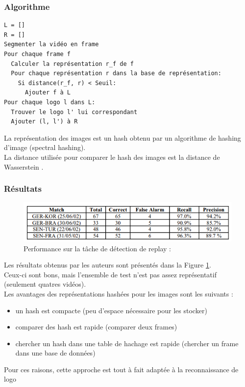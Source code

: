 \documentclass[11pt]{article}
\begin{document}
\subsubsection{Algorithme}
\label{sec:orgb02b649}
\begin{verbatim}
L = []
R = []
Segmenter la vidéo en frame
Pour chaque frame f
  Calculer la représentation r_f de f
  Pour chaque représentation r dans la base de représentation:
    Si distance(r_f, r) < Seuil:
      Ajouter f à L
Pour chaque logo l dans L:
  Trouver le logo l' lui correspondant
  Ajouter (l, l') à R
\end{verbatim}
La représentation des images est un hash obtenu par un algorithme de hashing d'image (spectral hashing).\\
La distance utilisée pour comparer le hash des images est la distance de Wasserstein .\\


\subsubsection{Résultats}
\label{sec:org3187a14}
\begin{figure}[htbp]
\centering
\includegraphics[width=.9\linewidth]{mean_shift_res.png}
\caption{Performance sur la tâche de détection de replay :\label{mean-shift-res}}
\end{figure}
Les résultats obtenus par les auteurs sont présentés dans la Figure \ref{mean-shift-res}.\\
Ceux-ci sont bons, mais l'ensemble de test n'est pas assez représentatif (seulement quatres vidéos).\\
Les avantages des représentations hashées pour les images sont les suivants :\\
\begin{itemize}
\item un hash est compacte (peu d'espace nécessaire pour les stocker)\\
\item comparer des hash est rapide (comparer deux frames)\\
\item chercher un hash dans une table de hachage est rapide (chercher un frame dans une base de données)\\
\end{itemize}
Pour ces raisons, cette approche est tout à fait adaptée à la reconnaissance de logo\\
\end{document}

